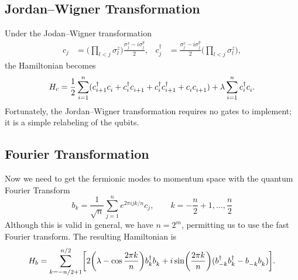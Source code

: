 \documentclass[12pt]{article}
\newcommand*{\eu}{e}
\newcommand*{\iu}{i}
\begin{document}
  \subsection{Jordan--Wigner Transformation}

  Under the Jodan--Wigner transformation
  \begin{align}
    \label{eq:jordan-wigner}
    c_{j}
      &= \biggl( \prod_{l < j} \sigma_{l}^{z} \biggr)
         \frac{\sigma_{j}^{x} - \iu \sigma_{j}^{y}}{2},
    &
    c_{j}^{\dagger}
      &= \frac{\sigma^{x}_{j} - \iu \sigma^{y}_{j}}{2}
         \biggl( \prod_{l < j} \sigma^{z}_{l} \biggr),
  \end{align}
  the Hamiltonian becomes
  \begin{equation}
    \label{eq:hamiltonian-fermion}
    H_{c}
      = \frac{1}{2}
        \sum_{i = 1}^{n} (c_{i + 1}^{\dagger} c_{i}^{\vphantom{\dagger}}
                          + c_{i}^{\dagger} c_{i + 1}^{\vphantom{\dagger}}
                          + c_{i}^{\dagger} c_{i + 1}^{\dagger}
                          + c_{i}^{\vphantom{\dagger}}
                            c_{i + 1}^{\vphantom{\dagger}})
        + \lambda \sum_{i = 1}^{n} c_{i}^{\dagger} c_{i}^{\vphantom{\dagger}}.
  \end{equation}
  Fortunately, the Jordan--Wigner transformation requires no gates to implement; it is a simple relabeling of the qubits.


  \subsection{Fourier Transformation}

  Now we need to get the fermionic modes to momentum space with the quantum Fourier Transform
  \begin{equation}
    \label{eq:qft}
    b_{k}
      = \frac{1}{\sqrt{n}}
        \sum_{j = 1}^{n} \eu^{2 \pi \iu j k / n} c_{j}, \qquad
    k = -\frac{n}{2} + 1, \dotsc, \frac{n}{2}
  \end{equation}
  Although this is valid in general, we have \( n = 2^{m} \), permitting us to use the fast Fourier transform. The resulting Hamiltonian is
  \begin{equation}
    H_{b}
      = \sum_{k = -n / 2 + 1}^{n / 2}
        \biggl[
          2 \biggl( \lambda - \cos \frac{2 \pi k}{n} \biggr)
          b_{k}^{\dagger} b_{k}^{\vphantom{\dagger}}
          + \iu \sin \biggl( \frac{2 \pi k}{n} \biggr)
            (b_{-k}^{\dagger} b_{k}^{\dagger}
             - b_{-k}^{\vphantom{\dagger}} b_{k}^{\vphantom{\dagger}})
        \biggr].
  \end{equation}
\end{document}
